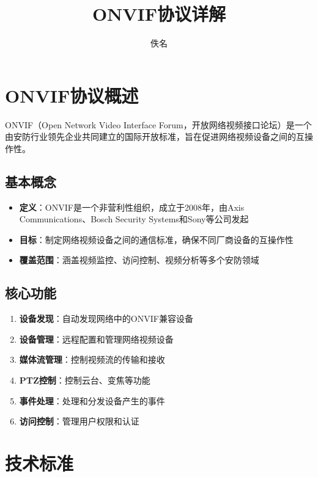 \documentclass[12pt,UTF8]{ctexbook}
\title{\heiti\zihao{0} ONVIF协议详解}
\author{佚名}
\date{}
\begin{document}
\maketitle
\tableofcontents

\frontmatter

\mainmatter

\chapter{ONVIF协议概述}

ONVIF（Open Network Video Interface Forum，开放网络视频接口论坛）是一个由安防行业领先企业共同建立的国际开放标准，旨在促进网络视频设备之间的互操作性。

\section{基本概念}

\begin{itemize}
  \item \textbf{定义}：ONVIF是一个非营利性组织，成立于2008年，由Axis Communications、Bosch Security Systems和Sony等公司发起
  \item \textbf{目标}：制定网络视频设备之间的通信标准，确保不同厂商设备的互操作性
  \item \textbf{覆盖范围}：涵盖视频监控、访问控制、视频分析等多个安防领域
\end{itemize}

\section{核心功能}

\begin{enumerate}
  \item \textbf{设备发现}：自动发现网络中的ONVIF兼容设备
  \item \textbf{设备管理}：远程配置和管理网络视频设备
  \item \textbf{媒体流管理}：控制视频流的传输和接收
  \item \textbf{PTZ控制}：控制云台、变焦等功能
  \item \textbf{事件处理}：处理和分发设备产生的事件
  \item \textbf{访问控制}：管理用户权限和认证
\end{enumerate}

\chapter{技术标准}
\end{document}
